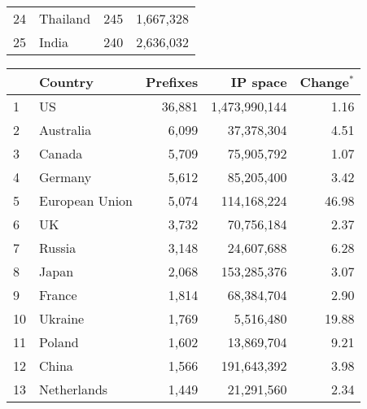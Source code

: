 \begin{table*}[tp]
\begin{minipage}[t]{0.48\textwidth}
\begin{center}
\begin{tabular}{|l||l|r|r|}
24      &       Thailand        &       245     &       1,667,328       \tabularnewline
25      &       India   		&       240     &       2,636,032       \tabularnewline
	\hline
	\end{tabular}
	\end{center}
\end{minipage}
%
\quad
%
\begin{minipage}[t]{0.48\textwidth}
	\begin{center}
	\caption{Top 25 countries with the most number of allocated IP blocks on \textbf{April 23, 2009}}
	\label{tab:top25 rir prefixes 2009}
	\begin{tabular}{|l||l|r|r|r|}
		\hline
		&      \bf Country		& \bf Prefixes  &       \bf IP space 	& \bf Change$^{*}$ 	\tabularnewline \hline 
1       &       US      &       36,881  &       1,473,990,144   &         1.16  \tabularnewline
2       &       Australia       &       6,099   &       37,378,304      &         4.51  \tabularnewline
3       &       Canada  &       5,709   &       75,905,792      &         1.07  \tabularnewline
4       &       Germany &       5,612   &       85,205,400      &         3.42  \tabularnewline
5       &       European Union  &       5,074   &       114,168,224     &        46.98  \tabularnewline
6       &       UK      &       3,732   &       70,756,184      &         2.37  \tabularnewline
7       &       Russia  &       3,148   &       24,607,688      &         6.28  \tabularnewline
8       &       Japan   &       2,068   &       153,285,376     &         3.07  \tabularnewline
9       &       France  &       1,814   &       68,384,704      &         2.90  \tabularnewline
10      &       Ukraine &       1,769   &       5,516,480       &        19.88  \tabularnewline
11      &       Poland  &       1,602   &       13,869,704      &         9.21  \tabularnewline
12      &       China   &       1,566   &       191,643,392     &         3.98  \tabularnewline
13      &       Netherlands     &       1,449   &       21,291,560      &         2.34  \tabularnewline

\end{tabular}
\end{center}
\end{minipage}
\end{table*}
